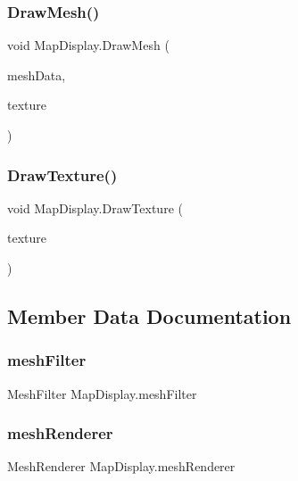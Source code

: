 \subsubsection{\texorpdfstring{Draw\+Mesh()}{DrawMesh()}}
{\footnotesize\ttfamily void Map\+Display.\+Draw\+Mesh (\begin{DoxyParamCaption}\item[{\mbox{\hyperlink{class_mesh_data}{Mesh\+Data}}}]{mesh\+Data,  }\item[{Texture2D}]{texture }\end{DoxyParamCaption})}

\mbox{\label{class_map_display_a27468745a8df537d3da3d0ce5814fc5b}} 
\subsubsection{\texorpdfstring{Draw\+Texture()}{DrawTexture()}}
{\footnotesize\ttfamily void Map\+Display.\+Draw\+Texture (\begin{DoxyParamCaption}\item[{Texture2D}]{texture }\end{DoxyParamCaption})}



\subsection{Member Data Documentation}
\mbox{\label{class_map_display_a56e864aaaecac3844a10fd98a69e0ab0}} 
\subsubsection{\texorpdfstring{mesh\+Filter}{meshFilter}}
{\footnotesize\ttfamily Mesh\+Filter Map\+Display.\+mesh\+Filter}

\mbox{\label{class_map_display_aa517e3c2a6f717cd74a8554e01476a1f}} 
\subsubsection{\texorpdfstring{mesh\+Renderer}{meshRenderer}}
{\footnotesize\ttfamily Mesh\+Renderer Map\+Display.\+mesh\+Renderer}

